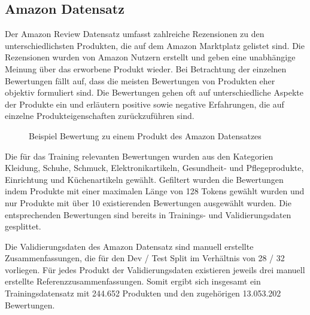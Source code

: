 \subsection{Amazon Datensatz}
Der Amazon Review Datensatz \citep{brazinskas2020-unsupervised} umfasst zahlreiche Rezensionen zu den unterschiedlichsten Produkten, die auf dem Amazon Marktplatz gelistet sind.
Die Rezensionen wurden von Amazon Nutzern erstellt und geben eine unabhängige Meinung über das erworbene Produkt wieder.
Bei Betrachtung der einzelnen Bewertungen fällt auf, dass die meisten Bewertungen von Produkten eher objektiv formuliert sind. 
Die Bewertungen gehen oft auf unterschiedliche Aspekte der Produkte ein und erläutern positive sowie negative Erfahrungen, die auf einzelne Produkteigenschaften zurückzuführen sind.

\setlength{\fboxsep}{1em}

\begin{figure}[!h]
    \centering
    \scriptsize
    \caption{Beispiel Bewertung zu einem Produkt des Amazon Datensatzes}
\end{figure}

Die für das Training relevanten Bewertungen wurden aus den Kategorien Kleidung, Schuhe, Schmuck, Elektronikartikeln, Gesundheit- und Pflegeprodukte, Einrichtung und Küchenartikeln gewählt.
Gefiltert wurden die Bewertungen indem Produkte mit einer maximalen Länge von 128 Tokens gewählt wurden und nur Produkte mit über 10 existierenden Bewertungen ausgewählt wurden. 
Die entsprechenden Bewertungen sind bereits in Trainings- und Validierungsdaten gesplittet.

Die Validierungsdaten des Amazon Datensatz sind manuell erstellte Zusammenfassungen, die für den Dev / Test Split im Verhältnis von 28 / 32 vorliegen.
Für jedes Produkt der Validierungsdaten existieren jeweils drei manuell erstellte Referenzzusammenfassungen.
Somit ergibt sich insgesamt ein Trainingsdatensatz mit 244.652 Produkten und den zugehörigen 13.053.202 Bewertungen.

